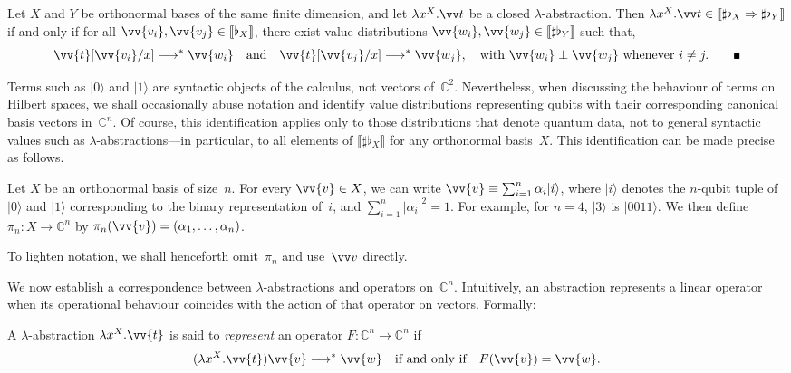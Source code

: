 \documentclass[runningheads,orivec,envcountsame,envcountsect]{llncs}
\providecommand{\qed}{\hbox{\rule{1ex}{1ex}}}%
\newcommand\ket[1]{\ensuremath{|#1\rangle}}
\newcommand\lra{\longrightarrow}
\def\C{\mathbb{C}}            %
\def\Lam#1#2#3{\lambda#1^{#2}{.}#3} %
\def\eval{\lra^*}
\def\Arr{\Rightarrow}
\def\sem#1{\llbracket#1\rrbracket}
\newcommand\basis[1]{\ensuremath{\flat_{#1}}}
\begin{document}
\begin{lemma}\label{lem:BasesIso}
  Let $X$ and $Y$ be orthonormal bases of the same finite
  dimension, and let $\Lam{x}{{X}}{\vv t}$ be a closed $\lambda$-abstraction.
  Then $\Lam{x}{{X}}{\vv t}\in\sem{\sharp\basis{X}\Arr\sharp\basis{Y}}$
  if and only if 
  for all $\vv{v_i},\vv{v_j}\in\sem{\basis{X}}$,
  there exist value distributions
  $\vv{w_i},\vv{w_j}\in\sem{\sharp\basis{Y}}$ such that,
  \[
    \vv{t}[\vv{v_i}/x]\eval\vv{w_i}
    \quad\text{and}\quad
    \vv{t}[\vv{v_j}/x]\eval\vv{w_j},
    \quad\text{with } 
    \vv{w_i}\perp\vv{w_j}\text{ whenever }i\neq j.
    \tag*{\qed}
  \]
\end{lemma}

Terms such as $\ket{0}$ and $\ket{1}$ are syntactic objects of the
calculus, not vectors of~$\C^2$. Nevertheless, when discussing the behaviour of
terms on Hilbert spaces, we shall occasionally abuse notation and identify
value distributions representing qubits with their corresponding canonical
basis vectors in~$\C^n$. Of course, this identification applies only to those
distributions that denote quantum data, not to general syntactic values such as
$\lambda$-abstractions---in particular, to all elements of
$\sem{\sharp\basis{X}}$ for any orthonormal basis~$X$. This identification can
be made precise as follows.

\begin{definition}
  Let $X$ be an orthonormal basis of size~$n$. For every $\vv{v}\in X$, we can
  write
  \(
    \vv{v}\equiv \sum_{i=1}^{n}\alpha_i\ket{i}
  \),
  where $\ket{i}$ denotes the $n$-qubit tuple of $\ket{0}$ and $\ket{1}$
  corresponding to the binary representation of~$i$, and
  $\sum_{i=1}^{n}|\alpha_i|^2=1$. For example, for $n=4$, $\ket{3}$ is
  $\ket{0011}$. We then define $\pi_n:X\to\C^n$ by
  \(
    \pi_n(\vv{v}) = (\alpha_1,\dotsc,\alpha_n)
  \).
\end{definition}

To lighten notation, we shall henceforth omit~$\pi_n$ and use~$\vv v$
directly.

We now establish a correspondence between $\lambda$-abstractions and operators
on~$\C^n$. Intuitively, an abstraction represents a linear operator when its
operational behaviour coincides with the action of that operator on vectors.
Formally:

\begin{definition}
  A $\lambda$-abstraction $\Lam{x}{{X}}{\vv{t}}$ is said to \emph{represent}
  an operator $F:\C^n\to\C^n$ if
  \[
    (\Lam{x}{{X}}{\vv{t}})\vv{v} \eval \vv{w}
    \quad\text{if and only if}\quad
    F(\vv{v}) = \vv{w}.
  \]
\end{definition}
\end{document}
